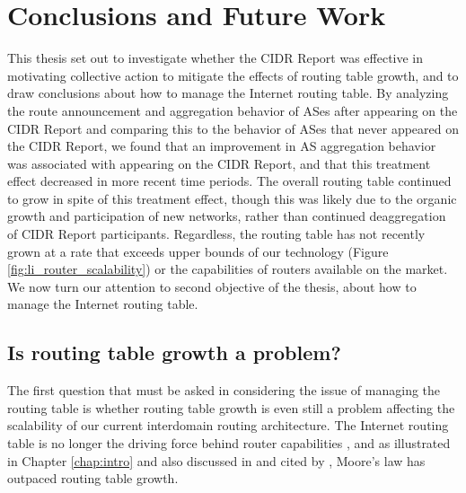 \chapter{Conclusions and Future Work}
\label{chap:conclusion}

This thesis set out to investigate whether the CIDR Report was effective in
motivating collective action to mitigate the effects of routing table growth,
and to draw conclusions about how to manage the Internet routing table. By
analyzing the route announcement and aggregation behavior of ASes after
appearing on the CIDR Report and comparing this to the behavior of ASes that
never appeared on the CIDR Report, we found that an improvement in AS
aggregation behavior was associated with appearing on the CIDR Report, and that
this treatment effect decreased in more recent time periods. The overall
routing table continued to grow in spite of this treatment effect, though this
was likely due to the organic growth and participation of new networks, rather
than continued deaggregation of CIDR Report participants. Regardless, the
routing table has not recently grown at a rate that exceeds upper bounds of our
technology (Figure \ref{fig:li_router_scalability}) or the capabilities of
routers available on the market. We now turn our attention to second objective
of the thesis, about how to manage the Internet routing table.


\section{Is routing table growth a problem?}
The first question that must be asked in considering the issue of managing the
routing table is whether routing table growth is even still a problem affecting
the scalability of our current interdomain routing architecture. The Internet
routing table is no longer the driving force behind router capabilities
\cite{Davie:2011uq}, and as illustrated in Chapter \ref{chap:intro} and also
discussed in \cite{Fall:2009fk} and cited by \cite{Huston:2011ys}, Moore's law
has outpaced routing table growth.

